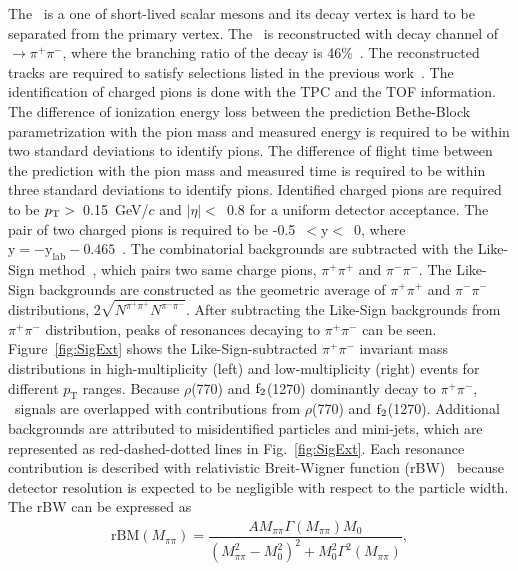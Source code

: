 The \fzero~is a one of short-lived scalar mesons and its decay vertex is hard to be separated from the primary vertex. The \fzero~is reconstructed with decay channel of \fzero~$\rightarrow \pi^{+}\pi^{-}$, where the branching ratio of the decay is 46\%~\cite{Stone:2013eaa}. The reconstructed tracks are required to satisfy selections listed in the previous work~\cite{ALICE:2018qdv}. The identification of charged pions is done with the TPC and the TOF information. The difference of ionization energy loss between the prediction Bethe-Block parametrization with the pion mass and measured energy is required to be within two standard deviations to identify pions. The difference of flight time between the prediction with the pion mass and measured time is required to be within three standard deviations to identify pions. Identified charged pions are required to be $p_{\rm{T}}>$~0.15~GeV/$c$ and $|\eta|<$~0.8 for a uniform detector acceptance. The pair of two charged pions is required to be -0.5~$<\mathrm{y}<$~0, where $\mathrm{y} = -\mathrm{y}_{\mathrm{lab}} -0.465$~\cite{ALICE:2017pgw}. The combinatorial backgrounds are subtracted with the Like-Sign method~\cite{PhysRevD.36.2019}, which pairs two same charge pions, $\pi^{+}\pi^{+}$ and $\pi^{-}\pi^{-}$. The Like-Sign backgrounds are constructed as the geometric average of $\pi^{+}\pi^{+}$ and $\pi^{-}\pi^{-}$ distributions,  2$\sqrt{N^{\pi^{+}\pi^{+}}N^{\pi^{-}\pi^{-}}}$. After subtracting the Like-Sign backgrounds from $\pi^{+}\pi^{-}$ distribution, peaks of resonances decaying to $\pi^{+}\pi^{-}$ can be seen. Figure~\ref{fig:SigExt} shows the Like-Sign-subtracted $\pi^{+}\pi^{-}$ invariant mass distributions in high-multiplicity (left) and low-multiplicity (right) events for different $p_{\mathrm{T}}$ ranges. Because $\rho$(770) and $\rm{f}_{2}$(1270) dominantly decay to $\pi^{+}\pi^{-}$, \fzero~signals are overlapped with contributions from $\rho$(770) and $\rm{f}_{2}$(1270). Additional backgrounds are attributed to misidentified particles and mini-jets, which are represented as red-dashed-dotted lines in Fig.~\ref{fig:SigExt}. Each resonance contribution is described with relativistic Breit-Wigner function (rBW)~\cite{ALICE:2018qdv, ALICE:2022qnb} because detector resolution is expected to be negligible with respect to the particle width. The rBW can be expressed as
\begin{eqnarray}
\mathrm{rBM}(M_{\pi\pi}) = \dfrac{AM_{\pi\pi}\Gamma(M_{\pi\pi})M_{0}}{(M_{\pi\pi}^{2}-M_{0}^{2})^{2} + M_{0}^{2}\Gamma^{2}(M_{\pi\pi})},
\label{eq:rBW}
\end{eqnarray}

